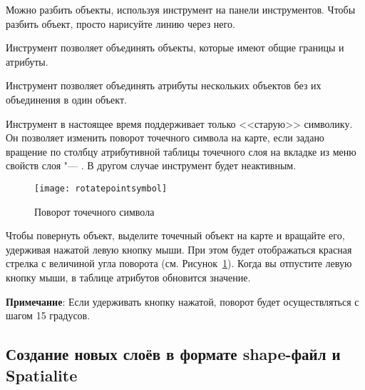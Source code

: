 
Можно разбить объекты, используя инструмент
 на панели
инструментов. Чтобы разбить объект, просто нарисуйте линию через него.


Инструмент 
позволяет объединять объекты, которые имеют общие границы и атрибуты.


Инструмент 
позволяет объединять атрибуты нескольких объектов без их объединения в
один объект.


Инструмент  в
настоящее время поддерживает только <<старую>> символику. Он позволяет
изменить поворот точечного символа на карте, если задано вращение по
столбцу атрибутивной таблицы точечного слоя на вкладке 
из меню свойств слоя "--- . В другом случае инструмент
будет неактивным.

\begin{figure}[ht]
   \centering
   \texttt{[image: rotatepointsymbol]}
   \caption{Поворот точечного символа \wincaption}\label{fig:rotatepoint}
\end{figure}

Чтобы повернуть объект, выделите точечный объект на карте и вращайте его,
удерживая нажатой левую кнопку мыши. При этом будет отображаться красная
стрелка с величиной угла поворота (см. Рисунок~\ref{fig:rotatepoint}).
Когда вы отпустите левую кнопку мыши, в таблице атрибутов обновится значение.

\textbf{Примечание}: Если удерживать кнопку  нажатой, поворот
будет осуществляться с шагом 15 градусов.

\subsection{Создание новых слоёв в формате shape-файл и Spatialite}\label{sec:create shape}

